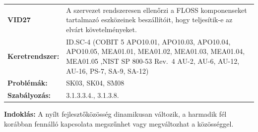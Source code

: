 \documentclass[12pt,magyar,a4paper,oneside]{scrreprt}
\begin{document}
\begin{longtable}[]{@{}ll@{}}
\toprule
\endhead
\begin{minipage}[t]{0.16\columnwidth}\raggedright
\textbf{VID27}\strut
\end{minipage} & \begin{minipage}[t]{0.79\columnwidth}\raggedright
A szervezet rendszeresen ellenőrzi a FLOSS komponenseket tartalmazó
eszközeinek beszállítóit, hogy teljesítik-e az elvárt
követelményeket.\strut
\end{minipage}\tabularnewline
\begin{minipage}[t]{0.16\columnwidth}\raggedright
\textbf{Keretrendszer:}\strut
\end{minipage} & \begin{minipage}[t]{0.79\columnwidth}\raggedright
ID.SC-4 (COBIT 5 APO10.01, APO10.03, APO10.04, APO10.05, MEA01.01,
MEA01.02, MEA01.03, MEA01.04, MEA01.05 ,NIST SP 800-53 Rev.~4 AU-2,
AU-6, AU-12, AU-16, PS-7, SA-9, SA-12)\strut
\end{minipage}\tabularnewline
\begin{minipage}[t]{0.16\columnwidth}\raggedright
\textbf{Problémák:}\strut
\end{minipage} & \begin{minipage}[t]{0.79\columnwidth}\raggedright
SK03, SK04, SM08\strut
\end{minipage}\tabularnewline
\begin{minipage}[t]{0.16\columnwidth}\raggedright
\textbf{Szabályozás:}\strut
\end{minipage} & \begin{minipage}[t]{0.79\columnwidth}\raggedright
3.1.3.3.4., 3.1.3.8.\strut
\end{minipage}\tabularnewline
\bottomrule
\end{longtable}

\textbf{Indoklás: } A nyílt fejlesztőközösség dinamikusan változik, a
harmadik fél korábban fennálló kapcsolata megszűnhet vagy megváltozhat a
közösséggel.
\end{document}
